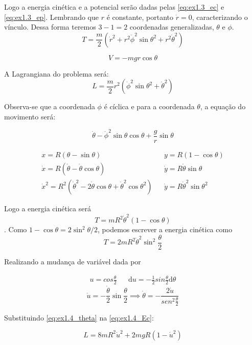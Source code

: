 Logo a energia cinética e a potencial serão dadas pelas \eqref{eq:ex1.3_ec} e \eqref{eq:ex1.3_ep}. Lembrando que $r$ é constante, portanto $\dot{r}=0$, caracterizando o vínculo. Dessa forma teremos $3-1=2$ coordenadas generalizadas, $\theta$ e $\phi$.
\noindent
\begin{equation}\label{eq:ex1.3_ec}
    T=\frac{m}{2}(\dot{r}^2+r^2\dot{\phi}^2\sin{\theta}^2+r^2\dot{\theta}^2)
\end{equation}

\begin{equation}\label{eq:ex1.3_ep}
    V = -mgr\cos{\theta}
\end{equation}

A Lagrangiana do problema será:
\begin{equation}
    L = \frac{m}{2}r^2(\dot{\phi}^2\sin{\theta}^2+\dot{\theta}^2)
\end{equation}

Observa-se que a coordenada $\phi$ é cíclica e para a coordenada $\theta$, a equação do movimento será:

\begin{equation}
    \dot{\theta}-\dot{\phi}^2\sin{\theta}\cos{\theta}+\frac{g}{r}\sin{\theta}
\end{equation}





    \begin{align}\nonumber
    x = R(\theta -\sin{\theta}) & & y = R(1-\cos{\theta}) \\ \dot{x} = R(\dot{\theta}-\dot{\theta}\cos{\theta}) & & \dot{y} = R\dot{\theta}\sin{\theta} \\
    \dot{x}^2 = R^2(\dot{\theta}^2-2\dot{\theta}\cos{\theta}+\dot{\theta}^2\cos{\theta}^2) & & \dot{y}=R\dot{\theta}^2\sin{\theta}^2
\end{align}

Logo a energia cinética será
\noindent
\begin{equation}\label{eq:ex1.4_Ec}
    T=mR^2\dot{\theta}^2(1-\cos{\theta})
\end{equation}. Como $1-\cos{\theta}=2\sin^2{\theta/2}$, podemos escrever a energia cinética como
\begin{equation}
    T=2mR^2\dot{\theta}^2\sin^2{\frac{\theta}{2}}
\end{equation}

Realizando a mudança de variável dada por

\begin{align}
    u=cos\frac{\theta}{2} && \mathrm{d}u=-\frac{1}{2}sin\frac{\theta}{2}\mathrm{d}\theta
\end{align}
\begin{equation} \label{eq:ex1.4_theta}
    \dot{u}=-\frac{\dot{\theta}}{2}\sin{\frac{\theta}{2}} \implies \dot{\theta}=-\frac{2\dot{u}}{sen^2\frac{\theta}{2}}
\end{equation}

Substituindo \eqref{eq:ex1.4_theta} na \eqref{eq:ex1.4_Ec}:

\begin{equation}
    L=8mR^2\dot{u}^2+2mgR(1-\dot{u}^2)
\end{equation}
